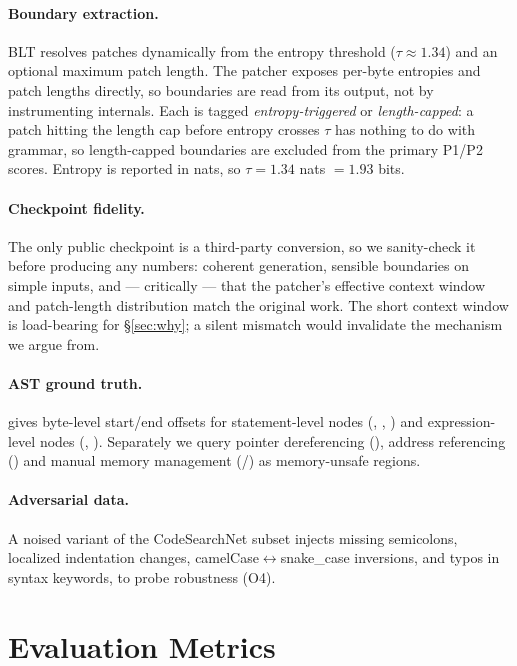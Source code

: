 \paragraph{Boundary extraction.} BLT resolves patches dynamically from the entropy threshold
($\tau \approx 1.34$) and an optional maximum patch length. The patcher exposes per-byte
entropies and patch lengths directly, so boundaries are read from its output, not by instrumenting
internals. Each is tagged \emph{entropy-triggered} or \emph{length-capped}: a
patch hitting the length cap before entropy crosses $\tau$ has nothing to do with grammar,
so length-capped boundaries are excluded from the primary P1/P2 scores. Entropy is reported
in nats, so $\tau = 1.34$ nats $= 1.93$ bits.

\paragraph{Checkpoint fidelity.} The only public checkpoint is a third-party conversion, so
we sanity-check it before producing any numbers: coherent generation, sensible boundaries on
simple inputs, and --- critically --- that the patcher's effective context window and
patch-length distribution match the original work. The short
context window is load-bearing for \S\ref{sec:why}; a silent mismatch would invalidate the
mechanism we argue from.

\paragraph{AST ground truth.}  gives byte-level start/end offsets for
statement-level nodes (, , ) and
expression-level nodes (, ). Separately we
query pointer dereferencing (\code{*}), address referencing (\code{\&}) and manual memory
management (/) as memory-unsafe regions.

\paragraph{Adversarial data.} A noised variant of the CodeSearchNet subset injects missing
semicolons, localized indentation changes, camelCase$\leftrightarrow$snake\_case inversions,
and typos in syntax keywords, to probe robustness (O4).

\section{Evaluation Metrics}
\label{sec:metrics}


